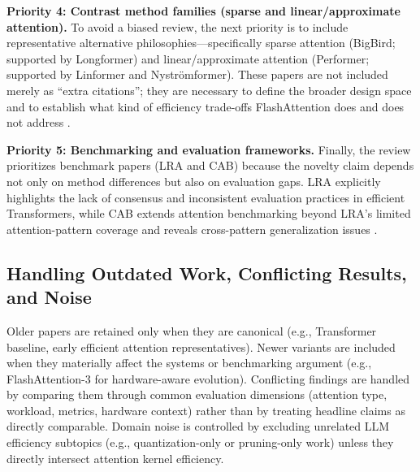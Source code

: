 \documentclass[12pt, a4paper]{article}
\begin{document}
\textbf{Priority 4: Contrast method families (sparse and linear/approximate attention).}
To avoid a biased review, the next priority is to include representative alternative philosophies---specifically sparse attention (BigBird; supported by Longformer) and linear/approximate attention (Performer; supported by Linformer and Nystr\"{o}mformer). These papers are not included merely as ``extra citations''; they are necessary to define the broader design space and to establish what kind of efficiency trade-offs FlashAttention does and does not address \parencite{zaheer2021bigbirdtransformerslonger, beltagy2020longformerlongdocumenttransformer, choromanski2022rethinkingattentionperformers, wang2020linformerselfattentionlinearcomplexity, xiong2021nystromformernystrombasedalgorithmapproximating}.

\textbf{Priority 5: Benchmarking and evaluation frameworks.}
Finally, the review prioritizes benchmark papers (LRA and CAB) because the novelty claim depends not only on method differences but also on evaluation gaps. LRA explicitly highlights the lack of consensus and inconsistent evaluation practices in efficient Transformers, while CAB extends attention benchmarking beyond LRA's limited attention-pattern coverage and reveals cross-pattern generalization issues \parencite{tay2020longrangearenabenchmark, zhang2025cabcomprehensiveattentionbenchmarking}.

\subsection{Handling Outdated Work, Conflicting Results, and Noise}

Older papers are retained only when they are canonical (e.g., Transformer baseline, early efficient attention representatives). Newer variants are included when they materially affect the systems or benchmarking argument (e.g., FlashAttention-3 for hardware-aware evolution). Conflicting findings are handled by comparing them through common evaluation dimensions (attention type, workload, metrics, hardware context) rather than by treating headline claims as directly comparable. Domain noise is controlled by excluding unrelated LLM efficiency subtopics (e.g., quantization-only or pruning-only work) unless they directly intersect attention kernel efficiency.


\end{document}
